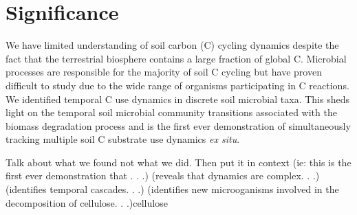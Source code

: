 \section{Significance} 
We have limited understanding of soil carbon (C) cycling dynamics despite the fact that the terrestrial biosphere contains a large fraction of global C. Microbial processes are responsible for the majority of soil C cycling but have proven difficult to study due to the wide range of organisms participating in C reactions. We identified temporal C use dynamics in discrete soil microbial taxa. This sheds light on the temporal soil microbial community transitions associated with the biomass degradation process and is the first ever demonstration of simultaneously tracking multiple soil C substrate use dynamics \textit{ex situ}.   

    

Talk about what we found not what we did. Then put it in context (ie: this is the first ever demonstration that . . .) (reveals that dynamics are complex. . .) (identifies temporal cascades. . .) (identifies new microoganisms involved in the decomposition of cellulose. . .)cellulose